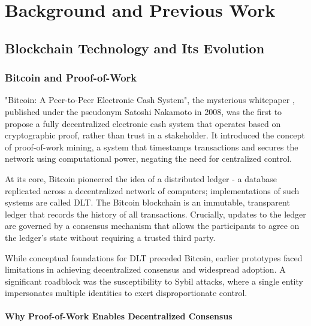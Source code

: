\documentclass[11pt]{report}
\begin{document}
\chapter{Background and Previous Work} \label{ch:previous_work}


\section{Blockchain Technology and Its Evolution}
\subsection{Bitcoin and Proof-of-Work}
"Bitcoin: A Peer-to-Peer Electronic Cash System", the mysterious whitepaper \cite{nakamotoBitcoinPeertopeerElectronic2008}, published under the pseudonym Satoshi Nakamoto in 2008, was the first to propose a fully decentralized electronic cash system that operates based on cryptographic proof, rather than trust in a stakeholder. It introduced the concept of proof-of-work mining, a system that timestamps transactions and secures the network using computational power, negating the need for centralized control.

At its core, Bitcoin pioneered the idea of a distributed ledger - a database replicated across a decentralized network of computers; implementations of such systems are called \ac{DLT}. The Bitcoin blockchain is an immutable, transparent ledger that records the history of all transactions. Crucially, updates to the ledger are governed by a consensus mechanism that allows the participants to agree on the ledger's state without requiring a trusted third party.

While conceptual foundations for \ac{DLT} preceded Bitcoin, earlier prototypes faced limitations in achieving decentralized consensus and widespread adoption. A significant roadblock was the susceptibility to Sybil attacks, where a single entity impersonates multiple identities to exert disproportionate control.

\subsubsection{Why Proof-of-Work Enables Decentralized Consensus}
\end{document}
